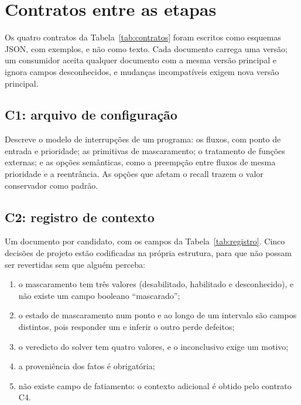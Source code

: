 \chapter{Contratos entre as etapas}
\label{ap:contratos}


Os quatro contratos da Tabela~\ref{tab:contratos} foram escritos como esquemas
JSON, com exemplos, e não como texto. Cada documento carrega uma versão; um
consumidor aceita qualquer documento com a mesma versão principal e ignora
campos desconhecidos, e mudanças incompatíveis exigem nova versão principal.

\section{C1: arquivo de configuração}

Descreve o modelo de interrupções de um programa: os fluxos, com ponto de
entrada e prioridade; as primitivas de mascaramento; o tratamento de funções
externas; e as opções semânticas, como a preempção entre fluxos de mesma
prioridade e a reentrância. As opções que afetam o recall trazem o valor
conservador como padrão.

\section{C2: registro de contexto}

Um documento por candidato, com os campos da Tabela~\ref{tab:registro}. Cinco
decisões de projeto estão codificadas na própria estrutura, para que não possam
ser revertidas sem que alguém perceba:

\begin{enumerate}
  \item o mascaramento tem três valores (desabilitado, habilitado e desconhecido), e não existe um campo booleano ``mascarado'';
  \item o estado de mascaramento num ponto e ao longo de um intervalo são campos
    distintos, pois responder um e inferir o outro perde defeitos;
  \item o veredicto do solver tem quatro valores, e o inconclusivo exige um
    motivo;
  \item a proveniência dos fatos é obrigatória;
  \item não existe campo de fatiamento: o contexto adicional é obtido pelo
    contrato C4.
\end{enumerate}

